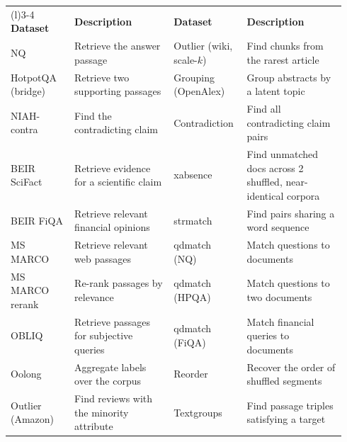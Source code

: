 \begin{table}[t]
\centering
\scriptsize
\setlength{\tabcolsep}{4pt}
\renewcommand{\arraystretch}{1.12}

\begin{tabular}{@{}
  >{\raggedright\arraybackslash}p{0.18\linewidth}
  >{\raggedright\arraybackslash}p{0.29\linewidth}
  >{\raggedright\arraybackslash}p{0.18\linewidth}
  >{\raggedright\arraybackslash}p{0.29\linewidth}
@{}}
\toprule
\multicolumn{2}{c}{\textbf{\(\mathbf{O}(N)\): One-pass tasks}} &
\multicolumn{2}{c}{\textbf{Higher-complexity tasks}} \\
\cmidrule(r){1-2}\cmidrule(l){3-4}
\textbf{Dataset} & \textbf{Description} &
\textbf{Dataset} & \textbf{Description} \\
\midrule

NQ
  & Retrieve the answer passage
  & Outlier (wiki, scale-\(k\))
  & Find chunks from the rarest article \\

HotpotQA (bridge)
  & Retrieve two supporting passages
  & Grouping (OpenAlex)
  & Group abstracts by a latent topic \\

NIAH-contra
  & Find the contradicting claim
  & Contradiction
  & Find all contradicting claim pairs \\

BEIR SciFact
  & Retrieve evidence for a scientific claim
  & xabsence
  & Find unmatched docs across 2 shuffled, near-identical corpora \\

BEIR FiQA
  & Retrieve relevant financial opinions
  & strmatch
  & Find pairs sharing a word sequence \\

MS MARCO
  & Retrieve relevant web passages
  & qdmatch (NQ)
  & Match questions to documents \\

MS MARCO rerank
  & Re-rank passages by relevance
  & qdmatch (HPQA)
  & Match questions to two documents \\

OBLIQ
  & Retrieve passages for subjective queries
  & qdmatch (FiQA)
  & Match financial queries to documents \\

Oolong
  & Aggregate labels over the corpus
  & Reorder
  & Recover the order of shuffled segments \\

Outlier (Amazon)
  & Find reviews with the minority attribute
  & Textgroups
  & Find passage triples satisfying a target \\


\end{tabular}
\end{table}
